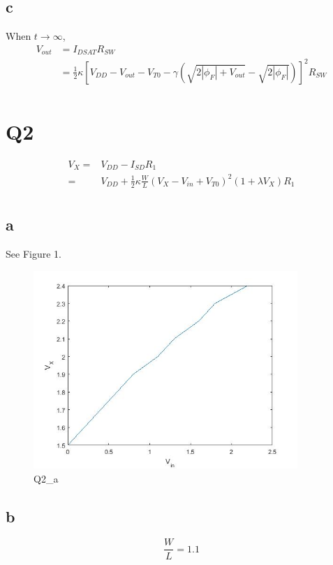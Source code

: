 \documentclass[a4paper,10pt]{article}
\begin{document}
\subsection*{c}
When \begin{math}t\rightarrow\infty\end{math},
\begin{equation}
\begin{split}
V_{out} &= I_{DSAT}R_{SW}\\
&= \frac{1}{2}\kappa[V_{DD} - V_{out} - V_{T0} - \gamma(\sqrt{2|\phi_F| + V_{out} } - \sqrt{2|\phi_F|})] ^2 R_{SW}\\
\end{split}
\end{equation}

\section*{Q2}
\begin{equation}
\begin{split}
V_X =& V_{DD} - I_{SD}R_1\\
=& V_{DD} + \frac{1}{2}\kappa\frac{W}{L}(V_X-V_{in}+V_{T0})^2 (1+\lambda V_X)R_1\\
\end{split}
\end{equation}
\subsection*{a}
See Figure 1.
\begin{figure}
 \centering
 \includegraphics[width=10cm]{Q2_a.jpg}
 \caption{Q2\_a}
\end{figure}
\subsection*{b}
\begin{equation}
\frac{W}{L} = 1.1
\end{equation}
\end{document}
